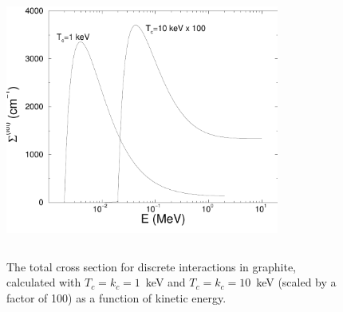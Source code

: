 \begin{figure}[htp]
\includegraphics[height=9cm,width=9cm]{figures/cs_all}
\caption[Total discrete interaction cross sections]{\label{sigmas}
The total cross section for
discrete interactions in graphite, calculated with
$T_c = k_c = 1$~keV and $T_c = k_c = 10$~keV
(scaled by a factor of 100) as a function of kinetic energy.}
\end{figure}

